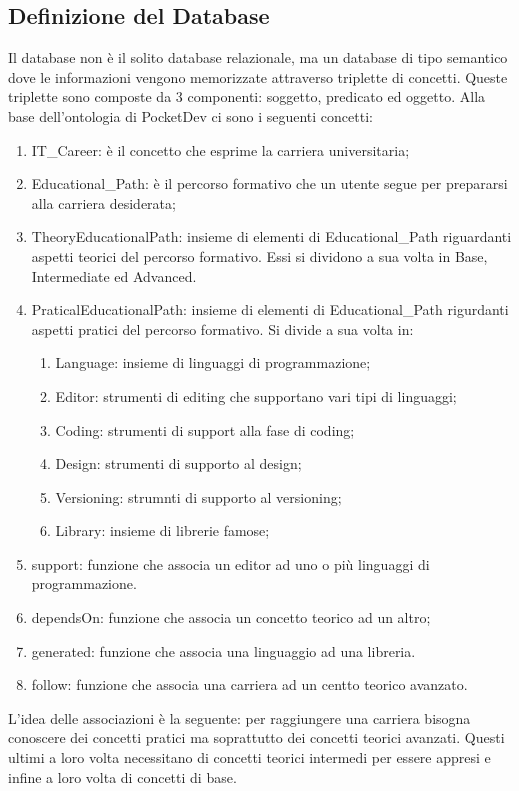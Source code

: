 \subsection{Definizione del Database}
Il database non è il solito database relazionale, ma un database di tipo semantico dove le informazioni vengono memorizzate attraverso triplette di concetti. Queste triplette sono composte da 3 componenti: soggetto, predicato ed oggetto. Alla base dell'ontologia di PocketDev ci sono i seguenti concetti:
\begin{enumerate}
 \item IT\_Career: è il concetto che esprime la carriera universitaria;
 \item Educational\_Path: è il percorso formativo che un utente segue per prepararsi alla carriera desiderata;
 \item TheoryEducationalPath: insieme di elementi di Educational\_Path riguardanti aspetti teorici del percorso formativo. Essi si dividono a sua volta in Base, Intermediate ed Advanced.
 \item PraticalEducationalPath: insieme di elementi di Educational\_Path rigurdanti aspetti pratici del percorso formativo. Si divide a sua volta in:
 \begin{enumerate}
  \item Language: insieme di linguaggi di programmazione;
  \item Editor: strumenti di editing che supportano vari tipi di linguaggi;
  \item Coding: strumenti di support alla fase di coding;
  \item Design: strumenti di supporto al design;
  \item Versioning: strumnti di supporto al versioning;
  \item Library: insieme di librerie famose;
 \end{enumerate}
 \item support: funzione che associa un editor ad uno o più linguaggi di programmazione.
 \item dependsOn: funzione che associa un concetto teorico ad un altro;
 \item generated: funzione che associa una linguaggio ad una libreria.
 \item follow: funzione che associa una carriera ad un centto teorico avanzato.
\end{enumerate}
L'idea delle associazioni è la seguente: per raggiungere una carriera bisogna conoscere dei concetti pratici ma soprattutto dei concetti teorici avanzati. Questi ultimi a loro volta necessitano di concetti teorici intermedi per essere appresi e infine a loro volta di concetti di base.

